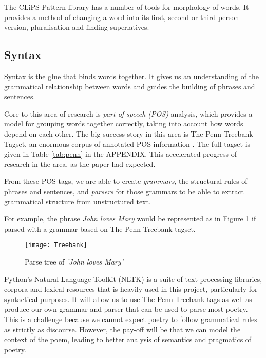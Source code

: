 The CLiPS Pattern library has a number of tools for morphology of words. It provides a method of changing a word into its first, second or third person version, pluralisation and finding superlatives.\cite{de2012pattern}


\subsection{Syntax}
\label{sec:syntax}
Syntax is the glue that binds words together. It gives us an understanding of the grammatical relationship between words and guides the building of phrases and sentences.

Core to this area of research is \textit{part-of-speech (POS)} analysis, which provides a model for grouping words together correctly, taking into account how words depend on each other. The big success story in this area is The Penn Treebank Tagset, an enormous corpus of annotated POS information \cite{marcus1993building}. The full tagset is given in Table \ref{tab:penn} in the APPENDIX. This accelerated progress of research in the area, as the paper had expected. 

From these POS tags, we are able to create \textit{grammars}, the structural rules of phrases and sentences, and \textit{parsers} for those grammars to be able to extract grammatical structure from unstructured text.

For example, the phrase \textit{John loves Mary} would be represented as in Figure \ref{fig:parse} if parsed with a grammar based on The Penn Treebank tagset.

\begin{figure}[h!]
\centering
\texttt{[image: Treebank]}
\caption{Parse tree of \textit{'John loves Mary'}}
\label{fig:parse}
\end{figure}

Python's Natural Language Toolkit (NLTK)\cite{bird2009natural} is a suite of text processing libraries, corpora and lexical resources that is heavily used in this project, particularly for syntactical purposes. It will allow us to use The Penn Treebank tags as well as produce our own grammar and parser that can be used to parse most poetry. This is a challenge because we cannot expect poetry to follow grammatical rules as strictly as discourse. However, the pay-off will be that we can model the context of the poem, leading to better analysis of semantics and pragmatics of poetry.

